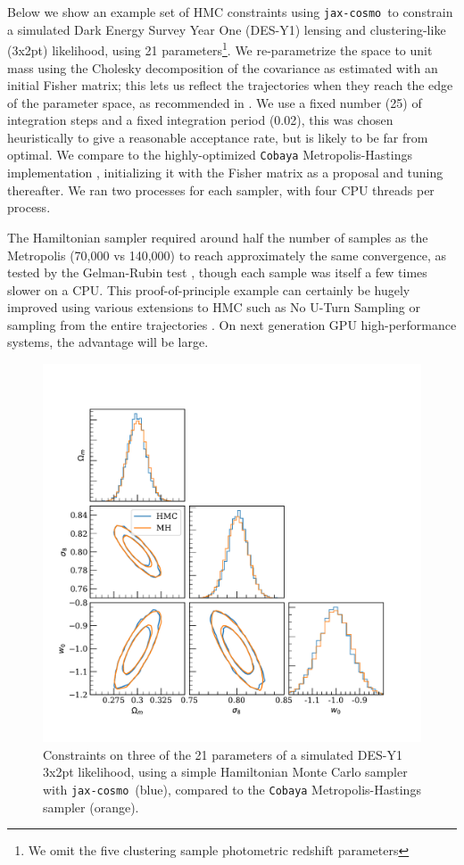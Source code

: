 \documentclass[final,5p,times,twocolumn,authoryear]{elsarticle}
\newcommand{\jaxcosmo}{\texttt{jax-cosmo}}
\begin{document}
Below we show an example set of HMC constraints using \jaxcosmo\ to constrain a simulated
Dark Energy Survey Year One (DES-Y1) lensing and clustering-like (3x2pt) likelihood, using 21 parameters\footnote{We omit the 
five clustering sample photometric redshift parameters}.  We re-parametrize the space to unit mass using the Cholesky 
decomposition
of the covariance as estimated with an initial Fisher matrix; this lets us reflect the trajectories when they reach the
edge of the parameter space, as recommended in \citep{NIPS2015_8303a79b}.  We use a fixed number (25) of integration steps and 
a fixed integration period (0.02), this was chosen heuristically to give a reasonable acceptance rate, but is likely to be
far from optimal.  We compare to the highly-optimized \texttt{Cobaya} 
Metropolis-Hastings implementation  %
\citep{2019ascl.soft10019T,2021JCAP...05..057T}, initializing it with the Fisher matrix as a proposal and
tuning thereafter.  We ran two processes for each sampler, with four CPU threads per process.

The Hamiltonian sampler required around half the number of samples as the Metropolis (70,000 vs 140,000) to reach approximately the same
convergence, as tested by the Gelman-Rubin test \citep{gelman}, though each sample was itself a few times slower
on a CPU.  This proof-of-principle example can certainly be hugely improved using various extensions to HMC such as No U-Turn Sampling \citep{nuts} or sampling from the entire trajectories \cite{betancourt}.  On next generation GPU high-performance systems, the advantage will be large.

\begin{figure}
\includegraphics[width=0.95\columnwidth]{figures/hmc.pdf}
\caption{Constraints on three of the 21 parameters of a simulated DES-Y1 3x2pt likelihood, using a simple Hamiltonian
Monte Carlo sampler with \jaxcosmo\ (blue), compared to the \texttt{Cobaya} Metropolis-Hastings sampler (orange).}
\end{figure}
\end{document}
